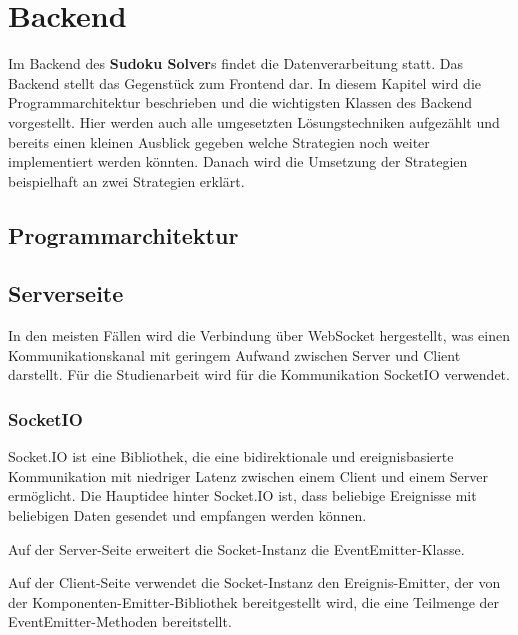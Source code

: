 
\chapter{Backend}

Im Backend des \textbf{Sudoku Solver}s findet die Datenverarbeitung statt. Das Backend stellt das Gegenstück zum Frontend dar. In diesem Kapitel wird die Programmarchitektur beschrieben und die wichtigsten Klassen des Backend vorgestellt. Hier werden auch alle umgesetzten Lösungstechniken aufgezählt und bereits einen kleinen Ausblick gegeben welche Strategien noch weiter implementiert werden könnten. Danach wird die Umsetzung der Strategien beispielhaft an zwei Strategien erklärt.


\section{Programmarchitektur}


\section{Serverseite}


In den meisten Fällen wird die Verbindung über WebSocket hergestellt, was einen Kommunikationskanal mit geringem Aufwand zwischen Server und Client darstellt. Für die Studienarbeit wird für die Kommunikation SocketIO verwendet. 

\subsection{SocketIO}

Socket.IO ist eine Bibliothek, die eine bidirektionale und ereignisbasierte Kommunikation mit niedriger Latenz zwischen einem Client und einem Server ermöglicht. Die Hauptidee hinter Socket.IO ist, dass beliebige Ereignisse mit beliebigen Daten gesendet und empfangen werden können.

Auf der Server-Seite erweitert die Socket-Instanz die EventEmitter-Klasse.

Auf der Client-Seite verwendet die Socket-Instanz den Ereignis-Emitter, der von der Komponenten-Emitter-Bibliothek bereitgestellt wird, die eine Teilmenge der EventEmitter-Methoden bereitstellt.


